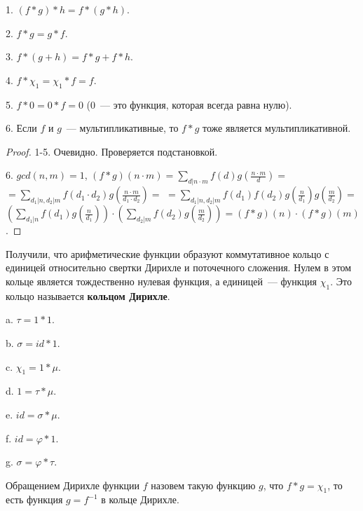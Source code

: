 \begin{properties}
    \label{Mobius: dirform}

    1. $(f * g) * h = f * (g * h)$.

    2. $f * g = g * f$.

    3. $f * (g + h) = f * g + f * h$.

    4. $f * \chi_1 = \chi_1 * f = f$.

    5. $f * 0 = 0 * f = 0$ ($0$~--- это функция, которая всегда равна нулю).

    6. Если $f$ и $g$~--- мультипликативные, то $f * g$ тоже является мультипликативной.
\end{properties}

\begin{proof}
    1-5. Очевидно. Проверяется подстановкой.

    6. $gcd(n, m)=1$, $(f*g)(n \cdot m) =  \sum \limits_{d|n \cdot m} f(d)g(\frac{n \cdot m}{d}) = $
    $= \sum \limits_{d_1|n, d_2|m} f(d_1 \cdot d_2) g(\frac{n \cdot m}{d_1 \cdot d_2}) =$
    $=\sum \limits_{d_1|n, d_2|m} f(d_1) f(d_2) g(\frac{n}{d_1}) g(\frac{m}{d_2}) = $
    $\left(\sum \limits_{d_1|n} f(d_1) g(\frac{n}{d_1})\right) \cdot \left(\sum \limits_{d_2|m} f(d_2) g(\frac{m}{d_2})\right) = (f * g)(n) \cdot (f * g)(m)$.
\end{proof}

Получили, что арифметические функции образуют коммутативное кольцо с единицей относительно свертки Дирихле и поточечного сложения.
Нулем в этом кольце является тождественно нулевая функция, а единицей~--- функция $\chi_1$. Это кольцо называется \textbf{кольцом Дирихле}.

\begin{example}
\label{Mobius: 1mu}
    a. $\tau = 1 * 1$.

    b. $\sigma = id * 1$.

    c. $\chi_1 = 1 * \mu$.

    d. $1 = \tau * \mu$.

    e. $id = \sigma * \mu$.

    f. $id = \varphi * 1$.

    g. $\sigma = \varphi * \tau$.

\end{example}


\begin{definition}
    Обращением Дирихле функции $f$ назовем такую функцию $g$, что
    $f * g = \chi_1$, то есть функция $g = f^{-1}$ в кольце Дирихле.
\end{definition}

